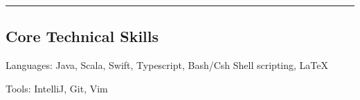 \documentclass[10pt,letterpaper]{article}
\newenvironment{indentsection}[1]%
{\begin{list}{}%
	{\setlength{\leftmargin}{#1}}%
	\item[]%
}
{\end{list}}
\begin{document}
\hrule
\vspace{-0.4em}

\subsection*{Core Technical Skills}

\begin{indentsection}{\parindent}
\begin{description*}
	\item[Languages:]
	Java, Scala, Swift, Typescript, Bash/Csh Shell scripting, \LaTeX
	\item[Tools:]
	IntelliJ, Git, Vim
\end{description*}
\end{indentsection}
\end{document}
